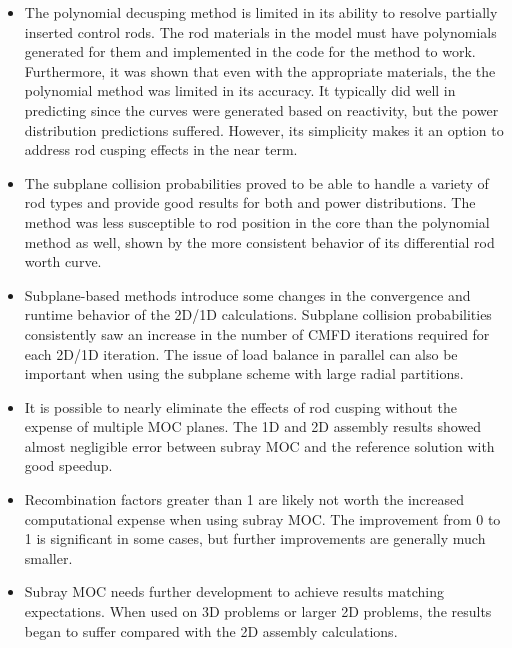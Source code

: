 \begin{itemize}
    \item The polynomial decusping method is limited in its ability to resolve partially inserted control rods.  The rod materials in the model must have polynomials generated for them and implemented in the code for the method to work.  Furthermore, it was shown that even with the appropriate materials, the the polynomial method was limited in its accuracy.  It typically did well in predicting \keff{} since the curves were generated based on reactivity, but the power distribution predictions suffered.  However, its simplicity makes it an option to address rod cusping effects in the near term.
    
    \item The subplane collision probabilities proved to be able to handle a variety of rod types and provide good results for both \keff{} and power distributions.  The method was less susceptible to rod position in the core than the polynomial method as well, shown by the more consistent behavior of its differential rod worth curve.
    
    \item Subplane-based methods introduce some changes in the convergence and runtime behavior of the 2D/1D calculations.  Subplane collision probabilities consistently saw an increase in the number of CMFD iterations required for each 2D/1D iteration.  The issue of load balance in parallel can also be important when using the subplane scheme with large radial partitions.
    
    \item It is possible to nearly eliminate the effects of rod cusping without the expense of multiple MOC planes.  The 1D and 2D assembly results showed almost negligible error between subray MOC and the reference solution with good speedup.
    
    \item Recombination factors greater than 1 are likely not worth the increased computational expense when using subray MOC.  The improvement from 0 to 1 is significant in some cases, but further improvements are generally much smaller.
    
    \item Subray MOC needs further development to achieve results matching expectations.  When used on 3D problems or larger 2D problems, the results began to suffer compared with the 2D assembly calculations.
\end{itemize}

